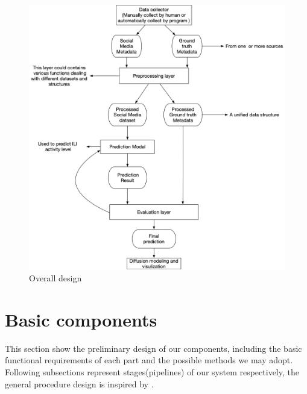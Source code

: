 \begin{figure}[!htp]
    \center
    \includegraphics[width=6in]{images/system2.png}
    \caption{Overall design}
    \label{fig:sys2}
\end{figure}
\section{Basic components}
This section show the preliminary design of our components, including the basic functional requirements of each part and the possible methods we may adopt. Following subsections represent stages(pipelines) of our system respectively, the general procedure design is inspired by \cite{feldman2007text}.
